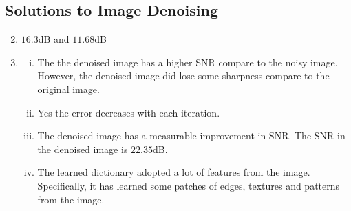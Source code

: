 \documentclass[12pt,letterpaper]{article}
\begin{document}
\subsection*{Solutions to Image Denoising}
\begin{enumerate} [1.]
 \setcounter{enumi}{1}
  \item $16.3$dB and $11.68$dB 
  \item
    \begin{enumerate} [i.]
    \item 
       The the denoised image has a higher SNR compare to the noisy image. However, the denoised image did lose some sharpness compare to the original image.
    \item 
       Yes the error decreases with each iteration.
    \item 
       The denoised image has a measurable improvement in SNR. The SNR in the denoised image is $22.35$dB. 
    \item 
       The learned dictionary adopted a lot of features from the image. Specifically, it has learned some patches of edges, textures and patterns from the image. 
    \end{enumerate}
\end{enumerate}
\pagebreak 


\end{document}
